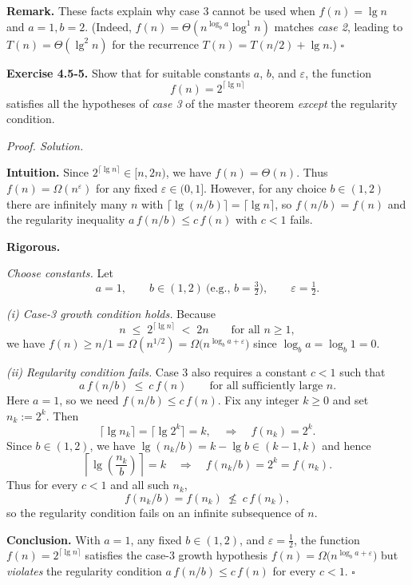 \documentclass[12pt]{article}
\theoremstyle{definition}
\begin{document}
\textbf{Remark.}
These facts explain why case 3 cannot be used when $f(n)=\lg n$ and $a=1,b=2$.
(Indeed, $f(n)=\Theta(n^{\log_b a}\log^1 n)$ matches \emph{case 2}, leading to $T(n)=\Theta(\lg^2 n)$ for the recurrence $T(n)=T(n/2)+\lg n$.)
\hfill$\square$

\newpage

\noindent\textbf{Exercise 4.5-5.}
Show that for suitable constants $a$, $b$, and $\varepsilon$, the function
\[
f(n)=2^{\lceil \lg n \rceil}
\]
satisfies all the hypotheses of \emph{case 3} of the master theorem \emph{except} the regularity condition.

\medskip
\noindent\textit{Proof. Solution.}

\noindent\textbf{Intuition.}
Since $2^{\lceil \lg n \rceil}\in[n,2n)$, we have $f(n)=\Theta(n)$.
Thus $f(n)=\Omega(n^{\varepsilon})$ for any fixed $\varepsilon\in(0,1]$.
However, for any choice $b\in(1,2)$ there are infinitely many $n$ with
$\lceil \lg(n/b)\rceil=\lceil \lg n\rceil$, so $f(n/b)=f(n)$ and the
regularity inequality $a\,f(n/b)\le c\,f(n)$ with $c<1$ fails.

\noindent\textbf{Rigorous.}

\emph{Choose constants.}
Let
\[
a=1,\qquad b\in(1,2)\ \text{(e.g., }b=\tfrac{3}{2}\text{)},\qquad \varepsilon=\tfrac{1}{2}.
\]

\emph{(i) Case-3 growth condition holds.}
Because
\[
n \;\le\; 2^{\lceil \lg n \rceil} \;<\; 2n\qquad\text{for all }n\ge 1,
\]
we have $f(n)\ge n/1=\Omega(n^{1/2})=\Omega\!\big(n^{\log_b a+\varepsilon}\big)$
since $\log_b a=\log_b 1=0$.

\emph{(ii) Regularity condition fails.}
Case 3 also requires a constant $c<1$ such that
\[
a\,f(n/b)\ \le\ c\,f(n)\qquad\text{for all sufficiently large }n.
\]
Here $a=1$, so we need $f(n/b)\le c\,f(n)$.
Fix any integer $k\ge 0$ and set $n_k:=2^{k}$. Then
\[
\lceil \lg n_k\rceil=\lceil \lg 2^{k}\rceil = k,\quad\Rightarrow\quad f(n_k)=2^{k}.
\]
Since $b\in(1,2)$, we have $\lg(n_k/b)=k-\lg b\in(k-1,k)$ and hence
\[
\left\lceil \lg\!\left(\frac{n_k}{b}\right)\right\rceil = k
\quad\Rightarrow\quad
f(n_k/b)=2^{k}=f(n_k).
\]
Thus for every $c<1$ and all such $n_k$,
\[
f(n_k/b)=f(n_k)\ \not\le\ c\,f(n_k),
\]
so the regularity condition fails on an infinite subsequence of $n$.

\textbf{Conclusion.}
With $a=1$, any fixed $b\in(1,2)$, and $\varepsilon=\tfrac12$, the function
$f(n)=2^{\lceil \lg n \rceil}$ satisfies the case-3 growth hypothesis
$f(n)=\Omega\!\big(n^{\log_b a+\varepsilon}\big)$ but \emph{violates} the
regularity condition $a\,f(n/b)\le c\,f(n)$ for every $c<1$.
\hfill$\square$
\end{document}
